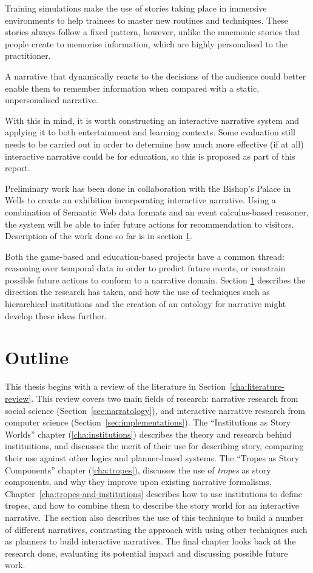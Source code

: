 Training simulations make the use of stories taking place in immersive environments to help trainees to master new routines and techniques. These stories always follow a fixed pattern, however, unlike the mnemonic stories that people create to memorise information, which are highly personalised to the practitioner.

A narrative that dynamically reacts to the decisions of the audience could better enable them to remember information when compared with a static, unpersonalised narrative.

With this in mind, it is worth constructing an interactive narrative system and applying it to both entertainment and learning contexts. Some evaluation still needs to be carried out in order to determine how much more effective (if at all) interactive narrative could be for education, so this is proposed as part of this report.

Preliminary work has been done in collaboration with the Bishop's Palace in Wells to create an exhibition incorporating interactive narrative. Using a combination of Semantic Web data formats and an event calculus-based reasoner, the system will be able to infer future actions for recommendation to visitors. Description of the work done so far is in section \ref{}.

Both the game-based and education-based projects have a common thread: reasoning
over temporal data in order to predict future events, or constrain possible
future actions to conform to a narrative domain. Section \ref{}
describes the direction the research has taken, and how the use of techniques such as hierarchical institutions and the creation of an ontology for narrative might develop these ideas further.


\section{Outline}
This thesis begins with a review of the literature in Section~\ref{cha:literature-review}. This review covers two main fields of research: narrative research from social science (Section~\ref{sec:narratology}), and interactive narrative research from computer science (Section~\ref{sec:implementations}).
The ``Institutions as Story Worlds'' chapter (\ref{cha:institutions}) describes the theory and research behind instituitions, and discusses the merit of their use for describing story, comparing their use against other logics and planner-based systems.
The ``Tropes as Story Components'' chapter (\ref{cha:tropes}), discusses the use
of \emph{tropes} as story components, and why they improve upon existing narrative formalisms.
Chapter~\ref{cha:tropes-and-institutions} describes how to use institutions to define tropes, and how to combine them to describe the story world for an interactive narrative. The section also describes the use of this technique to build a number of different narratives, contrasting the approach with using other techniques such as planners to build interactive narratives.
The final chapter looks back at the research done, evaluating its potential impact and discussing possible future work. 

